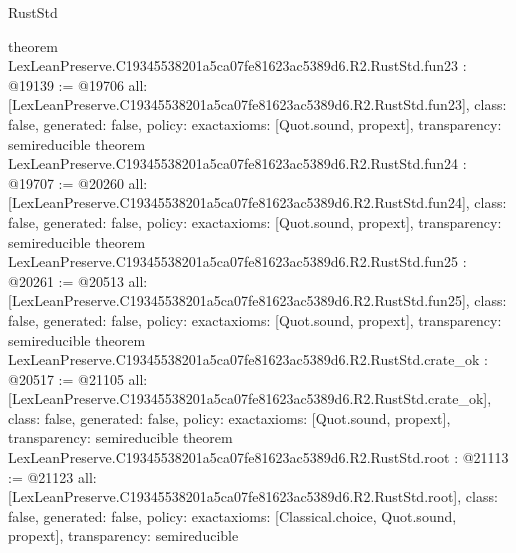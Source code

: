 \begin{lexlean}{RustStd}
\begin{coremodule}
{}
theorem LexLeanPreserve.C19345538201a5ca07fe81623ac5389d6.R2.RustStd.fun23 : @19139 := @19706 {
  all: [LexLeanPreserve.C19345538201a5ca07fe81623ac5389d6.R2.RustStd.fun23],
  class: false,
  generated: false,
  policy: exact{axioms: [Quot.sound, propext]},
  transparency: semireducible
}
theorem LexLeanPreserve.C19345538201a5ca07fe81623ac5389d6.R2.RustStd.fun24 : @19707 := @20260 {
  all: [LexLeanPreserve.C19345538201a5ca07fe81623ac5389d6.R2.RustStd.fun24],
  class: false,
  generated: false,
  policy: exact{axioms: [Quot.sound, propext]},
  transparency: semireducible
}
theorem LexLeanPreserve.C19345538201a5ca07fe81623ac5389d6.R2.RustStd.fun25 : @20261 := @20513 {
  all: [LexLeanPreserve.C19345538201a5ca07fe81623ac5389d6.R2.RustStd.fun25],
  class: false,
  generated: false,
  policy: exact{axioms: [Quot.sound, propext]},
  transparency: semireducible
}
theorem LexLeanPreserve.C19345538201a5ca07fe81623ac5389d6.R2.RustStd.crate_ok : @20517 := @21105 {
  all: [LexLeanPreserve.C19345538201a5ca07fe81623ac5389d6.R2.RustStd.crate_ok],
  class: false,
  generated: false,
  policy: exact{axioms: [Quot.sound, propext]},
  transparency: semireducible
}
theorem LexLeanPreserve.C19345538201a5ca07fe81623ac5389d6.R2.RustStd.root : @21113 := @21123 {
  all: [LexLeanPreserve.C19345538201a5ca07fe81623ac5389d6.R2.RustStd.root],
  class: false,
  generated: false,
  policy: exact{axioms: [Classical.choice, Quot.sound, propext]},
  transparency: semireducible
}


\end{coremodule}
\end{lexlean}
